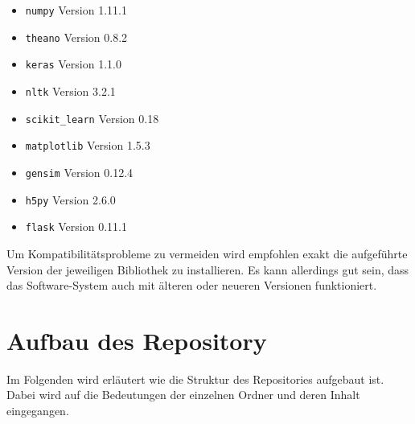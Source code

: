 \begin{appendices}
\begin{itemize}[noitemsep]
  \item \texttt{numpy} Version 1.11.1
  \item \texttt{theano} Version 0.8.2
  \item \texttt{keras} Version 1.1.0
  \item \texttt{nltk} Version 3.2.1
  \item \texttt{scikit{\_}learn} Version 0.18
  \item \texttt{matplotlib} Version 1.5.3
  \item \texttt{gensim} Version 0.12.4
  \item \texttt{h5py} Version 2.6.0
  \item \texttt{flask} Version 0.11.1
\end{itemize}

Um Kompatibilitätsprobleme zu vermeiden wird empfohlen exakt die aufgeführte Version der jeweiligen Bibliothek zu installieren. Es kann allerdings gut sein, dass das Software-System auch mit älteren oder neueren Versionen funktioniert.

\section{Aufbau des Repository}
Im Folgenden wird erläutert wie die Struktur des Repositories aufgebaut ist. Dabei wird auf die Bedeutungen der einzelnen Ordner und deren Inhalt eingegangen.


\end{appendices}
